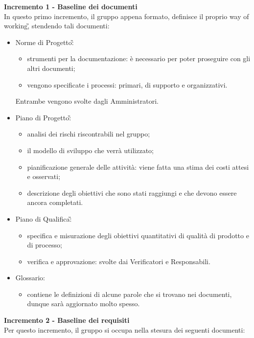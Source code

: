 {{        \textbf{Incremento 1 - Baseline dei documenti} \\ 
    In questo primo incremento, il gruppo appena formato, definisce il proprio way of working\G, stendendo tali documenti:
    \begin{itemize}
        \item Norme di Progetto\G:
            \begin{itemize}
                \item strumenti per la documentazione: è necessario per poter proseguire con gli altri documenti;
                \item vengono specificate i processi: primari, di supporto e organizzativi. 
            \end{itemize}
        Entrambe vengono svolte dagli Amministratori.
        \item Piano di Progetto\G: 
            \begin{itemize}
                \item analisi dei rischi riscontrabili nel gruppo;
                \item il modello di sviluppo che verrà utilizzato;
                \item pianificazione generale delle attività: viene fatta una stima dei costi attesi e osservati;
                \item descrizione degli obiettivi che sono stati raggiungi e che devono essere ancora completati.
            \end{itemize}
        \item Piano di Qualifica\G: 
            \begin{itemize}
                \item specifica e misurazione degli obiettivi quantitativi di qualità di prodotto e di processo;
                \item verifica e approvazione: svolte dai Verificatori e Responsabili.
            \end{itemize}
        \item Glossario: 
            \begin{itemize}
                \item contiene le definizioni di alcune parole che si trovano nei documenti, dunque sarà aggiornato molto spesso.
            \end{itemize}
    \end{itemize}
    \textbf{Incremento 2 - Baseline dei requisiti} \\
    Per questo incremento, il gruppo si occupa nella stesura dei seguenti documenti:
}}
